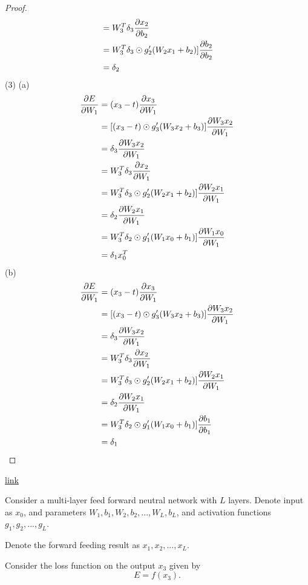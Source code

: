 \begin{refsection}
\begin{proof}
\begin{align*}
&= W_3^T\delta_3\frac{\partial x_2}{\partial b_2} \\
&= W_3^T\delta_3\odot g_2'(W_2x_1+b_2)]\frac{\partial b_2}{\partial b_2} \\
&= \delta_2
\end{align*}
(3)
(a)
\begin{align*}
\frac{\partial E}{\partial W_1} &= (x_3-t)\frac{\partial x_3}{\partial W_1} \\
&= [(x_3-t)\odot g'_3(W_3x_2 + b_3)]\frac{\partial W_3x_2}{\partial W_1} \\
&= \delta_3\frac{\partial W_3x_2}{\partial W_1} \\
&= W_3^T\delta_3\frac{\partial x_2}{\partial W_1} \\
&= W_3^T\delta_3\odot g_2'(W_2x_1+b_2)]\frac{\partial W_2x_1}{\partial W_1} \\
&= \delta_2 \frac{\partial W_2x_1}{\partial W_1} \\
&= W_3^T\delta_2\odot g_1'(W_1x_0+b_1)]\frac{\partial W_1x_0}{\partial W_1} \\
&= \delta_1 x_0^T 
\end{align*}
(b)
\begin{align*}
\frac{\partial E}{\partial W_1} &= (x_3-t)\frac{\partial x_3}{\partial W_1} \\
&= [(x_3-t)\odot g'_3(W_3x_2 + b_3)]\frac{\partial W_3x_2}{\partial W_1} \\
&= \delta_3\frac{\partial W_3x_2}{\partial W_1} \\
&= W_3^T\delta_3\frac{\partial x_2}{\partial W_1} \\
&= W_3^T\delta_3\odot g_2'(W_2x_1+b_2)]\frac{\partial W_2x_1}{\partial W_1} \\
&= \delta_2 \frac{\partial W_2x_1}{\partial W_1} \\
&= W_3^T\delta_2\odot g_1'(W_1x_0+b_1)]\frac{\partial b_1}{\partial b_1} \\
&= \delta_1 
\end{align*}
\end{proof}


\begin{theorem}\href{https://sudeepraja.github.io/Neural/}{link}

Consider a multi-layer feed forward neutral network with $L$ layers.
Denote input as $x_0$, and parameters $W_1, b_1,W_2, b_2,..., W_L, b_L$, and activation functions $g_1,g_2, ... , g_L$.

Denote the forward feeding result as $x_1,x_2,...,x_L$.

Consider the loss function on the output $x_3$ given by
$$E=f(x_3).$$


\end{theorem}
\end{refsection}
